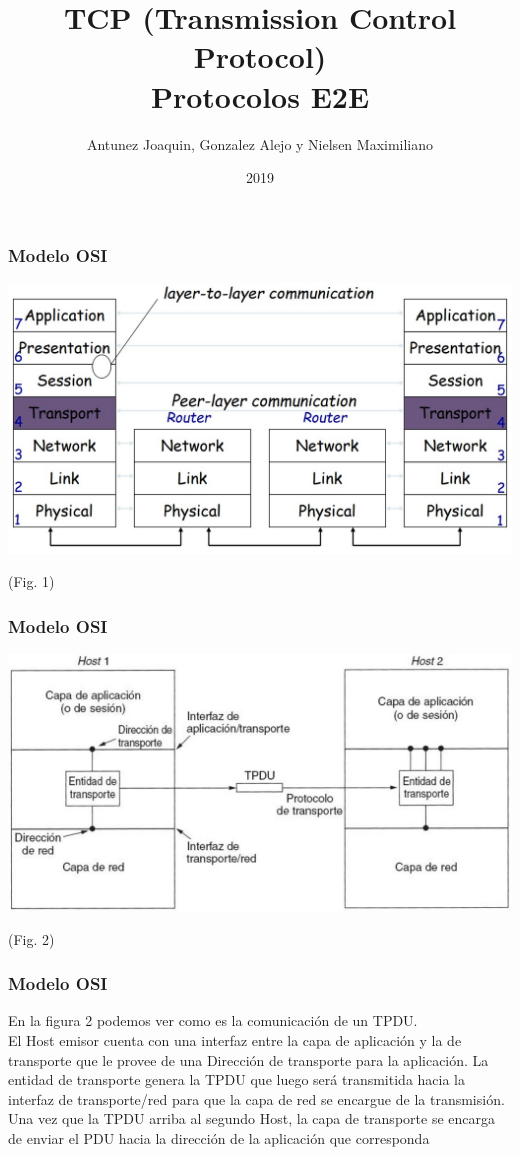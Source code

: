 \documentclass{beamer}
\title{TCP (Transmission Control Protocol) \\Protocolos E2E}
\author{Antunez Joaquin, Gonzalez Alejo y Nielsen Maximiliano}
\institute{Instituto Politecnico Superior}
\date{2019}
\begin{document}
	
	\frame{\titlepage}
	
	\begin{frame}
		\frametitle{Modelo OSI}
			\includegraphics[width=\textwidth]{modeloOSI}
			\begin{center}
				(Fig. 1)
			\end{center}
	\end{frame}


	\begin{frame}
		\frametitle{Modelo OSI}
		\includegraphics[width=\textwidth]{capas}
		\begin{center}
			(Fig. 2)
		\end{center}
	\end{frame}
	\begin{frame}
		\frametitle{Modelo OSI}
 	En la figura 2 podemos ver como es la comunicación de un TPDU.\\
	El Host emisor cuenta con una interfaz entre la capa de aplicación y la de transporte que le provee de una Dirección de transporte para la aplicación. La entidad de transporte genera la TPDU que luego será transmitida hacia la interfaz de transporte/red para que la capa de red se encargue de la transmisión.\\
 	Una vez que la TPDU arriba al segundo Host, la capa de transporte se encarga de enviar el PDU hacia la dirección de la aplicación que corresponda
	
	\end{frame}
\end{document}
